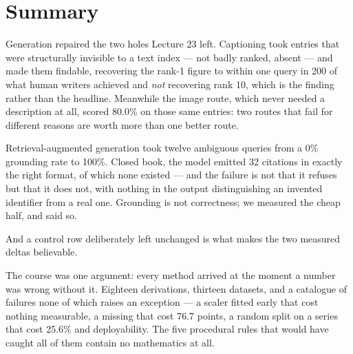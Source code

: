 \documentclass[11pt,a4paper]{article}
\begin{document}
\section*{Summary}

Generation repaired the two holes Lecture 23 left. Captioning took entries that
were structurally invisible to a text index --- not badly ranked, absent --- and
made them findable, recovering the rank-1 figure to within one query in 200 of
what human writers achieved and \emph{not} recovering rank 10, which is the
finding rather than the headline. Meanwhile the image route, which never needed
a description at all, scored 80.0\% on those same entries: two routes that fail
for different reasons are worth more than one better route.

Retrieval-augmented generation took twelve ambiguous queries from a 0\%
grounding rate to 100\%. Closed book, the model emitted 32 citations in exactly
the right format, of which none existed --- and the failure is not that it
refuses but that it does not, with nothing in the output distinguishing an
invented identifier from a real one. Grounding is not correctness; we measured
the cheap half, and said so.

And a control row deliberately left unchanged is what makes the two measured
deltas believable.

The course was one argument: every method arrived at the moment a number was
wrong without it. Eighteen derivations, thirteen datasets, and a catalogue of
failures none of which raises an exception --- a scaler fitted early that cost
nothing measurable, a missing  that cost 76.7 points, a
random split on a series that cost 25.6\% and deployability. The five
procedural rules that would have caught all of them contain no mathematics at
all.
\end{document}
